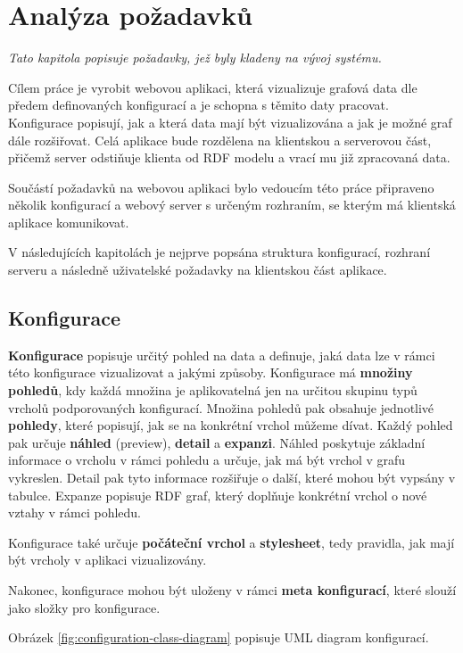 \chapter{Analýza požadavků}

\textit{Tato kapitola popisuje požadavky, jež byly kladeny na vývoj systému.}

Cílem práce je vyrobit webovou aplikaci, která vizualizuje grafová data dle předem definovaných konfigurací a je schopna s těmito daty pracovat. Konfigurace popisují, jak a která data mají být vizualizována a jak je možné graf dále rozšiřovat. Celá aplikace bude rozdělena na klientskou a serverovou část, přičemž server odstiňuje klienta od RDF modelu a vrací mu již zpracovaná data.

Součástí požadavků na webovou aplikaci bylo vedoucím této práce připraveno několik konfigurací a webový server s určeným rozhraním, se kterým má klientská aplikace komunikovat.

V následujících kapitolách je nejprve popsána struktura konfigurací, rozhraní serveru a následně uživatelské požadavky na klientskou část aplikace.

\section{Konfigurace}

\textbf{Konfigurace} popisuje určitý pohled na data a definuje, jaká data lze v rámci této konfigurace vizualizovat a jakými způsoby. Konfigurace má \textbf{množiny pohledů}, kdy každá množina je aplikovatelná jen na určitou skupinu typů vrcholů podporovaných konfigurací. Množina pohledů pak obsahuje jednotlivé \textbf{pohledy}, které popisují, jak se na konkrétní vrchol můžeme dívat. Každý pohled pak určuje \textbf{náhled} (preview), \textbf{detail} a \textbf{expanzi}. Náhled poskytuje základní informace o vrcholu v rámci pohledu a určuje, jak má být vrchol v grafu vykreslen. Detail pak tyto informace rozšiřuje o další, které mohou být vypsány v tabulce. Expanze popisuje RDF graf, který doplňuje konkrétní vrchol o nové vztahy v rámci pohledu.

Konfigurace také určuje \textbf{počáteční vrchol} a \textbf{stylesheet}, tedy pravidla, jak mají být vrcholy v aplikaci vizualizovány.

Nakonec, konfigurace mohou být uloženy v rámci \textbf{meta konfigurací}, které slouží jako složky pro konfigurace.

Obrázek \ref{fig:configuration-class-diagram} popisuje UML diagram konfigurací.

